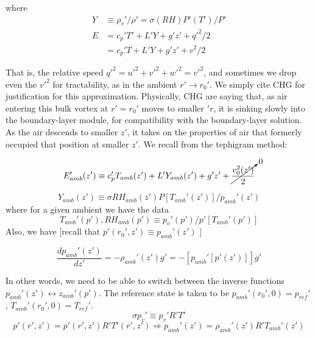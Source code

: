 \documentclass{article}
\begin{document}
\begin{itemize}
where 
\begin{equation}
\begin{split}
	Y &\equiv \rho_v' / \rho' = \sigma(RH) P'(T')/ P' \\
	E &= c_p' T' + L' Y + g'z' + q'^2 /2 \\
	&= c_p' T + L'Y + g'z' + v^2 / 2
\end{split}
\end{equation}

That is, the relative speed $q'^2 = u'^2 + v'^2 + w'^2 = v'^2$, and sometimes we drop even the $v'^2$ for tractability, as in the ambient $r' \to r_0'$. We simply cite CHG for justification for this approximation. Physically, CHG are saying that, as air entering this bulk vortex at $r' = r_0'$ moves to smaller $'r$, it is sinking slowly into the boundary-layer module, for compatibility with the boundary-layer solution. As the air descends to smaller $z'$, it takes on the properties of air that formerly occupied that position at smaller $z'$. We recall from the tephigram method:

\begin{equation}
	E_{amb}'(z') \equiv c_p' T_{amb}(z') + L' Y_{amb}(z') + g' z' + \cancelto{0}{\frac{v_0^2(z')}{2}}
\end{equation}

\begin{equation}
	Y_{amb}(z') \equiv \sigma RH_{amb}(z') P[T_{amb}'(z')] / p_{amb}'(z')
\end{equation}
where for a given ambient we have the data
\begin{equation}
	T_{amb}'(p'), RH_{amb}(p') \equiv p_v'(p')/p'[T_{amb}'(p')]
\end{equation}
Also, we have [recall that $p'(r_0', z') \equiv p_{amb}'(z')$ ]

\begin{equation}
	\frac{dp_{amb}'(z')}{dz'} = -\rho_{amb}'(z') g' = -[p_{amb}'[p'(z')]]g'
\end{equation}

In other words, we need to be able to switch between the inverse functions $p_{amb}'(z') \leftrightarrow z_{amb}'(p')$. The reference state is taken to be $p_{amb}'(r_0', 0) = p_{ref}'$, $T_{amb}'(r_0', 0) = T_{ref}'$.
\begin{equation}
	\sigma p_v' \equiv p_v' R' T'
\end{equation}
\begin{equation}
	p'(r',z') = p'(r',z')R'T'(r',z') \Rightarrow p_{amb}'(z') = \rho_{amb}'(z') R'T_{amb}'(z')
\end{equation}


\end{itemize}
\end{document}
